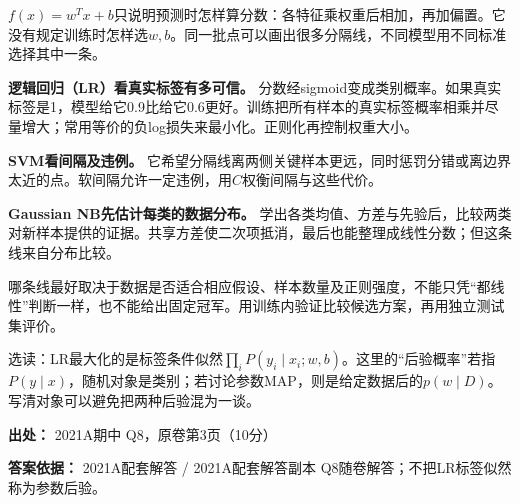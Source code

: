 \(f(x)=w^Tx+b\)只说明预测时怎样算分数：各特征乘权重后相加，再加偏置。它没有规定训练时怎样选\(w,b\)。同一批点可以画出很多分隔线，不同模型用不同标准选择其中一条。


\textbf{逻辑回归（LR）看真实标签有多可信。} 分数经sigmoid变成类别概率。如果真实标签是1，模型给它0.9比给它0.6更好。训练把所有样本的真实标签概率相乘并尽量增大；常用等价的负log损失来最小化。正则化再控制权重大小。


\textbf{SVM看间隔及违例。} 它希望分隔线离两侧关键样本更远，同时惩罚分错或离边界太近的点。软间隔允许一定违例，用\(C\)权衡间隔与这些代价。


\textbf{Gaussian NB先估计每类的数据分布。} 学出各类均值、方差与先验后，比较两类对新样本提供的证据。共享方差使二次项抵消，最后也能整理成线性分数；但这条线来自分布比较。


哪条线最好取决于数据是否适合相应假设、样本数量及正则强度，不能只凭“都线性”判断一样，也不能给出固定冠军。用训练内验证比较候选方案，再用独立测试集评价。


选读：LR最大化的是标签条件似然\(\prod_i P(y_i\mid x_i;w,b)\)。这里的“后验概率”若指\(P(y\mid x)\)，随机对象是类别；若讨论参数MAP，则是给定数据后的\(p(w\mid D)\)。写清对象可以避免把两种后验混为一谈。


\textbf{出处：} 2021A期中 Q8，原卷第3页（10分）


\textbf{答案依据：} 2021A配套解答 / 2021A配套解答副本 Q8随卷解答；不把LR标签似然称为参数后验。
